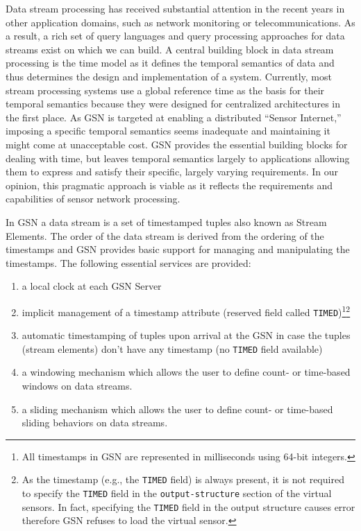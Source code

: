 Data stream processing has received substantial attention in the
recent years in other application domains, such as network monitoring
or telecommunications. As a result, a rich set of query languages and
query processing approaches for data streams exist on which we can
build. A central building block in data stream processing is the time
model as it defines the temporal semantics of data and thus determines
the design and implementation of a system. Currently, most stream
processing systems use a global reference time as the basis for their
temporal semantics because they were designed for centralized
architectures in the first place. As GSN is targeted at enabling a
distributed ``Sensor Internet,'' imposing a specific temporal semantics
seems inadequate and maintaining it might come at unacceptable cost.
GSN provides the essential building blocks for dealing with time, but
leaves temporal semantics largely to applications allowing them to
express and satisfy their specific, largely varying requirements. In
our opinion, this pragmatic approach is viable as it reflects the
requirements and capabilities of sensor network processing.

In GSN a data stream is a set of timestamped tuples also known as Stream Elements.
The order of the data stream is derived from the ordering of the timestamps and GSN
provides basic support for managing and manipulating the timestamps.
The following essential services are provided:

\begin{enumerate}
\item a local clock at each GSN Server
\item implicit management of a timestamp attribute (reserved field called \texttt{TIMED})\footnote{All timestamps in GSN are represented in milliseconds using 64-bit integers.}\footnote{As the timestamp (e.g., the \texttt{TIMED} field) is always present, it is not required to specify the \texttt{TIMED} field in the  \texttt{output-structure} section of the virtual sensors. In fact, specifying the \texttt{TIMED} field in the output structure causes error therefore GSN refuses to load the virtual sensor.}
\item automatic timestamping of tuples upon arrival at the GSN in case the tuples (stream elements) don't have
any timestamp (no \texttt{TIMED} field available)
\item a windowing mechanism which allows the user to define count- or
  time-based windows on data streams.
\item a sliding mechanism which allows the user to define count- or  time-based sliding behaviors on data streams.
\end{enumerate}


